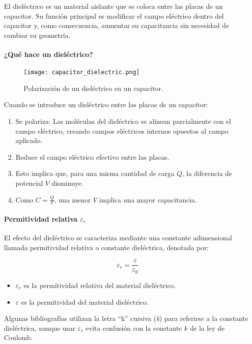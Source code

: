 El dieléctrico es un material aislante que se coloca entre las placas de un capacitor. Su función principal es modificar el campo eléctrico dentro del capacitor y, como consecuencia, aumentar su capacitancia sin necesidad de cambiar su geometría.

\paragraph{¿Qué hace un dieléctrico?}

\begin{figure}[ht]
    \centering
    \texttt{[image: capacitor\_dielectric.png]}
    \caption{Polarización de un dieléctrico en un capacitor.}
    \label{fig:capacitor_dieletrico}
\end{figure}
Cuando se introduce un dieléctrico entre las placas de un capacitor:
\begin{enumerate}
    \item Se polariza: Las moléculas del dieléctrico se alinean parcialmente con el campo eléctrico, creando campos eléctricos internos opuestos al campo aplicado.
    \item Reduce el campo eléctrico efectivo entre las placas.
    \item Esto implica que, para una misma cantidad de carga \( Q \), la diferencia de potencial \( V \) disminuye.
    \item Como \( C = \frac{Q}{V} \), una menor \( V \) implica una mayor capacitancia.
\end{enumerate}
\newpage
\paragraph{Permitividad relativa \( \varepsilon_r \)}

El efecto del dieléctrico se caracteriza mediante una constante adimensional llamada permitividad relativa o constante dieléctrica, denotada por:

\[
\varepsilon_r = \frac{\varepsilon}{\varepsilon_0}
\]

\begin{itemize}
    \item \( \varepsilon_r \) es la permitividad relativa del material dieléctrico.
    \item \( \varepsilon \) es la permitividad del material dieléctrico.
\end{itemize}

Algunas bibliografías utilizan la letra ``k'' cursiva (\textit{k}) para referirse a la constante dieléctrica, aunque usar \( \varepsilon_r \) evita confusión con la constante \(k\) d\textsl{}e la ley de Coulomb.

